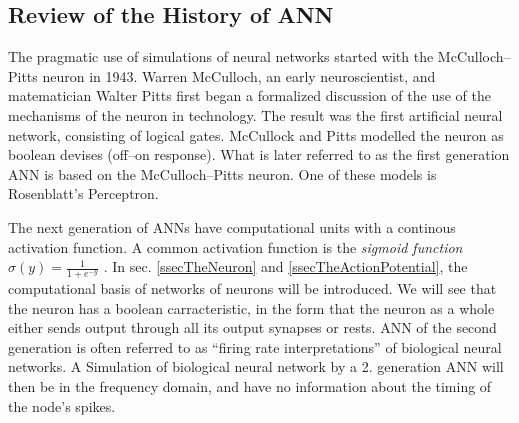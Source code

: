 
\subsection{Review of the History of ANN}
\label{ssecHistoryOfANN}
The pragmatic use of simulations of neural networks started with the McCulloch--Pitts neuron in 1943. 
Warren McCulloch, an early neuroscientist, and matematician Walter Pitts first began a formalized discussion of the use of the mechanisms of the neuron in technology. %
The result was the first artificial neural network, consisting of logical gates. McCullock and Pitts modelled the neuron as boolean devises (off--on response)\cite{MccullochPittsHistorie}. 
What is later referred to as the first generation ANN is based on the McCulloch--Pitts neuron\cite{Maass97networksof}.
One of these models is Rosenblatt's Perceptron\cite{HaykinANNbok}.

The next generation of ANNs have computational units with a continous activation function. 
A common activation function is the \emph{sigmoid function} $\sigma(y)=\frac{1}{1+e^{-y}}$ \cite{HaykinANNbok}.
In sec. \ref{ssecTheNeuron} and \ref{ssecTheActionPotential}, the computational basis of networks of neurons will be introduced. 
We will see that the neuron has a boolean carracteristic, in the form that the neuron as a whole either sends output through all its output synapses or rests. 
%
ANN of the second generation is often referred to as ``firing rate interpretations'' of biological neural networks\cite{Maass97networksof}.
A Simulation of biological neural network by a 2. generation ANN will then be in the frequency domain, and have no information about the timing of the node's spikes.



